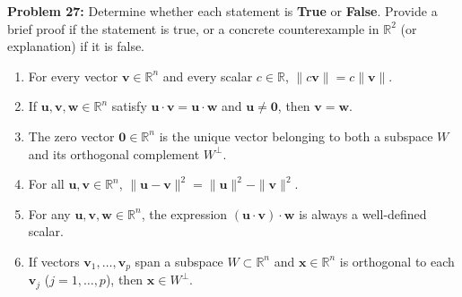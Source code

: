 \documentclass[11pt, letterpaper]{article}
\theoremstyle{definition}
\theoremstyle{remark}
\begin{document}
\textbf{Problem 27:} Determine whether each statement is \textbf{True} or \textbf{False}. Provide a brief proof if the statement is true, or a concrete counterexample in $\mathbb{R}^2$ (or explanation) if it is false.
\begin{enumerate}[label=(\alph*)]
    \item For every vector $\mathbf{v} \in \mathbb{R}^n$ and every scalar $c \in \mathbb{R}$, $\|c\mathbf{v}\| = c\|\mathbf{v}\|$.
    \item If $\mathbf{u}, \mathbf{v}, \mathbf{w} \in \mathbb{R}^n$ satisfy $\mathbf{u} \cdot \mathbf{v} = \mathbf{u} \cdot \mathbf{w}$ and $\mathbf{u} \neq \mathbf{0}$, then $\mathbf{v} = \mathbf{w}$.
    \item The zero vector $\mathbf{0} \in \mathbb{R}^n$ is the unique vector belonging to both a subspace $W$ and its orthogonal complement $W^{\perp}$.
    \item For all $\mathbf{u}, \mathbf{v} \in \mathbb{R}^n$, $\|\mathbf{u} - \mathbf{v}\|^2 = \|\mathbf{u}\|^2 - \|\mathbf{v}\|^2$.
    \item For any $\mathbf{u}, \mathbf{v}, \mathbf{w} \in \mathbb{R}^n$, the expression $(\mathbf{u} \cdot \mathbf{v}) \cdot \mathbf{w}$ is always a well-defined scalar.
    \item If vectors $\mathbf{v}_1, \dots, \mathbf{v}_p$ span a subspace $W \subset \mathbb{R}^n$ and $\mathbf{x} \in \mathbb{R}^n$ is orthogonal to each $\mathbf{v}_j$ ($j = 1, \dots, p$), then $\mathbf{x} \in W^{\perp}$.
\end{enumerate}
\end{document}

